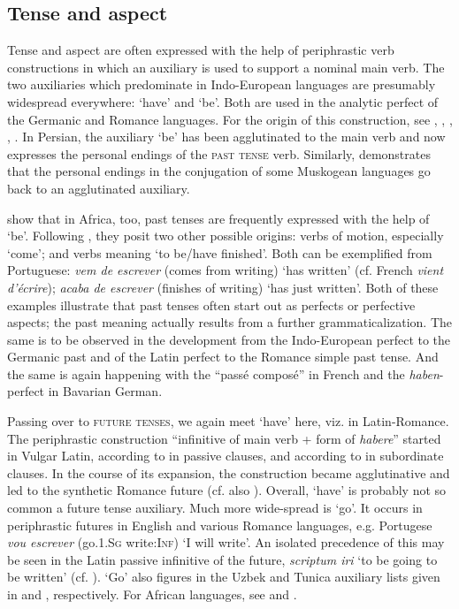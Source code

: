 \subsection{Tense and aspect} \label{sec:3.1.4}

Tense and aspect are often expressed with the help of periphrastic verb constructions in which an auxiliary is used to support a nominal main verb. The two auxiliaries which predominate in Indo-European languages are presumably widespread everywhere: ‘have’ and ‘be’. Both are used in the analytic perfect of the Germanic and Romance languages. For the origin of this construction, see \citet[141--143]{Meillet1912}, \citet[§\textsc{i}]{Benveniste1968}, \citet{Seiler1973}, \citet{Rosén1980}, \citet{Ramat1983}.\label{page31} In Persian, the auxiliary ‘be’ has been agglutinated to the main verb and now expresses the personal endings of the \textsc{past tense} verb. Similarly, \citet{Haas1977} demonstrates that the personal endings in the conjugation of some Muskogean languages go back to an agglutinated auxiliary.

\citet[130]{HeineEtAl1984} show that in Africa, too, past tenses are frequently expressed with the help of ‘be’. Following \citet[§5]{Givón1973}, they posit two other possible origins: verbs of motion, especially ‘come’; and verbs meaning ‘to be/have finished’. Both can be exemplified from Portuguese: \textit{vem de escrever} (comes from writing) ‘has written’ (cf. French \textit{vient d'écrire}); \textit{acaba de escrever} (finishes of writing) ‘has just written’. Both of these examples illustrate that past tenses often start out as perfects or perfective aspects; the past meaning actually results from a further grammaticalization. The same is to be observed in the development from the Indo-European perfect to the Germanic past and of the Latin perfect to the Romance simple past tense. And the same is again happening with the ``passé composé'' in French and the \textit{haben}-perfect in Bavarian German.

Passing over to \textsc{future tenses}, we again meet ‘have’ here, viz. in Latin-\linebreak Romance. The periphrastic construction ``infinitive of main verb + form of \textit{habere}'' started in Vulgar Latin, according to \citet[§\textsc{ii}]{Benveniste1968} in passive clauses, and according to \citet{Ineichen1980} in subordinate clauses. In the course of its expansion, the construction became agglutinative and led to the synthetic Romance future (cf. also \citealt[132--151]{Coseriu1974}). Overall, ‘have’ is probably not so common a future tense auxiliary. Much more wide-spread is ‘go’. It occurs in periphrastic futures in English and various Romance languages, e.g. Portugese \textit{vou escrever} (go.1.\textsc{Sg} write:\textsc{Inf}) ‘I will write’. An isolated precedence of this may be seen in the Latin passive infinitive of the future, \textit{scriptum iri} ‘to be going to be written’ (cf. \citealt[109--114]{Ultan1978b}). ‘Go’ also figures in the Uzbek and Tunica auxiliary lists given in \citet[85f]{Žirmunskij1966} and \citet[41--51]{Haas1941}, respectively. For African languages, see \citet[§5]{Givón1973} and \citet[131f]{HeineEtAl1984}.


